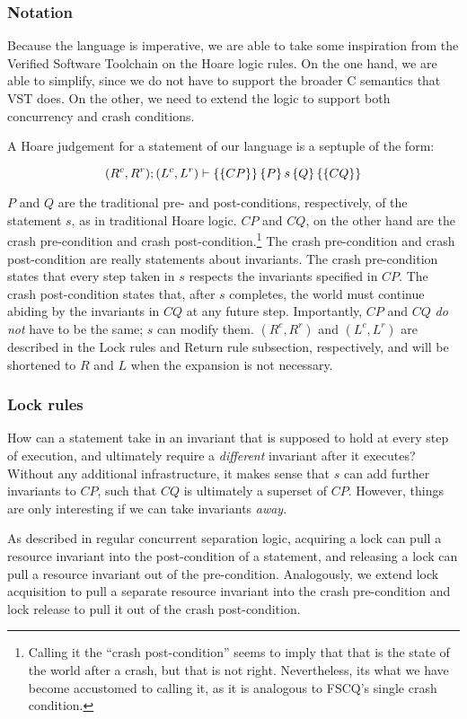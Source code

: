 \subsubsection{Notation}
Because the language is imperative, we are able to take some inspiration from
the Verified Software Toolchain on the Hoare logic rules. On the one hand, we
are able to simplify, since we do not have to support the broader C semantics
that VST does. On the other, we need to extend the logic to support both
concurrency and crash conditions.

A Hoare judgement for a statement of our language is a septuple of the form:

$$(R^c,R^r); (L^c,L^r) \vdash \left\{\left\{ CP \right\}\right\} \left\{ P \right\} s \left\{ Q \right\} \left\{\left\{ CQ \right\}\right\}$$

$P$ and $Q$ are the traditional pre- and post-conditions, respectively, of the
statement $s$, as in traditional Hoare logic. $CP$ and $CQ$, on the other hand
are the crash pre-condition and crash post-condition.\footnote{Calling it the
``crash post-condition'' seems to imply that that is the state of the world
after a crash, but that is not right. Nevertheless, its what we have become
accustomed to calling it, as it is analogous to FSCQ's single crash condition.}
The crash pre-condition and crash post-condition are really statements about
invariants. The crash pre-condition states that every step taken in $s$ respects
the invariants specified in $CP$. The crash post-condition states that, after
$s$ completes, the world must continue abiding by the invariants in $CQ$ at any
future step. Importantly, $CP$ and $CQ$ \textit{do not} have to be the same; $s$
can modify them. $(R^c,R^r)$ and $(L^c,L^r)$ are described in the Lock rules and
Return rule subsection, respectively, and will be shortened to $R$ and $L$ when
the expansion is not necessary.

\subsubsection{Lock rules}

How can a statement take in an invariant that is supposed to hold at every step
of execution, and ultimately require a \textit{different} invariant after it
executes? Without any additional infrastructure, it makes sense that $s$ can add
further invariants to $CP$, such that $CQ$ is ultimately a superset of $CP$.
However, things are only interesting if we can take invariants \textit{away}.

As described in regular concurrent separation logic, acquiring a lock can pull a
resource invariant into the post-condition of a statement, and releasing a lock can pull a
resource invariant out of the pre-condition. Analogously, we extend lock
acquisition to pull a separate resource invariant into the crash pre-condition
and lock release to pull it out of the crash post-condition.

